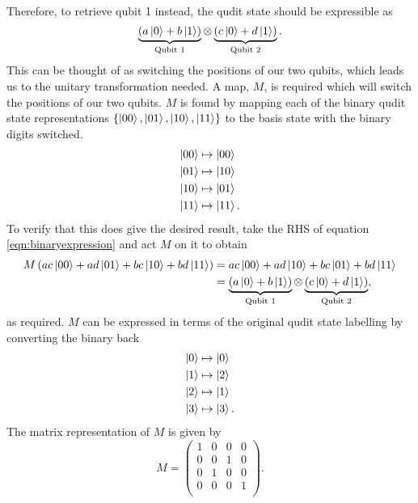 Therefore, to retrieve qubit 1 instead, the qudit state should be expressible as
\begin{equation}
    \underbrace{\left(a\ket{0} + b\ket{1}\right)}_{\text{Qubit 1}} \otimes \underbrace{\left(c\ket{0} + d\ket{1}\right)}_{\text{Qubit 2}}.
\end{equation}
This can be thought of as switching the positions of our two qubits, which leads us to the unitary transformation needed.
A map, $M$, is required which will switch the positions of our two qubits.
$M$ is found by mapping each of the binary qudit state representations $\{\ket{00}, \ket{01}, \ket{10}, \ket{11}\}$ to the basis state with the binary digits switched.
\begin{align}
    \ket{00} &\mapsto \ket{00}\\
    \ket{01} &\mapsto \ket{10}\\
    \ket{10} &\mapsto \ket{01}\\
    \ket{11} &\mapsto \ket{11}.
\end{align}
To verify that this does give the desired result, take the RHS of equation \ref{eqn:binaryexpression} and act $M$ on it to obtain
\begin{align}
    M\left(ac\ket{00} + ad\ket{01} + bc\ket{10} + bd\ket{11}\right) 
    &=  ac\ket{00} + ad\ket{10} + bc\ket{01} + bd\ket{11}\\
    &= \underbrace{\left(a\ket{0} + b\ket{1}\right)}_{\text{Qubit 1}} \otimes \underbrace{\left(c\ket{0} + d\ket{1}\right)}_{\text{Qubit 2}},
\end{align}
as required.
$M$ can be expressed in terms of the original qudit state labelling by converting the binary back
\begin{align}
    \ket{0} &\mapsto \ket{0}\\
    \ket{1} &\mapsto \ket{2}\\
    \ket{2} &\mapsto \ket{1}\\
    \ket{3} &\mapsto \ket{3}.
\end{align}
The matrix representation of $M$ is given by
\begin{equation}
    M = 
    \begin{pmatrix}
        1 & 0 & 0 & 0\\
        0 & 0 & 1 & 0\\
        0 & 1 & 0 & 0\\
        0 & 0 & 0 & 1\\
    \end{pmatrix}.
\end{equation}

